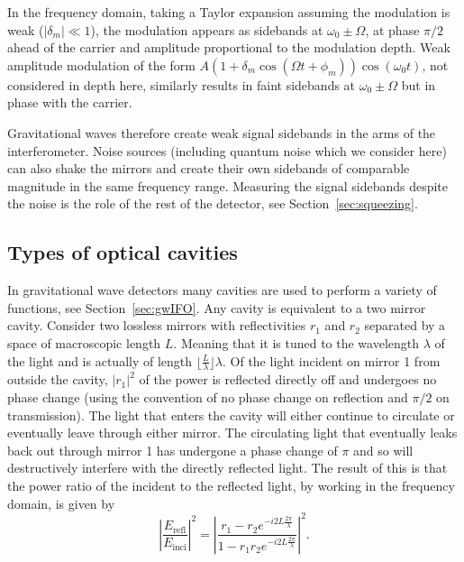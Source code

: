\documentclass[aps,pra,superscriptaddress,reprint,nofootinbib]{revtex4-1}
\newcommand{\abs}[1]{\left\lvert #1 \right\rvert}
\begin{document}
In the frequency domain, taking a Taylor expansion assuming the modulation is weak ($\abs{\delta_m} \ll 1$), the modulation appears as sidebands at $\omega_0 \pm \Omega$, at phase $\pi/2$ ahead of the carrier and amplitude proportional to the modulation depth.
Weak amplitude modulation of the form $A (1 + \delta_m \cos(\Omega t + \phi_m)) \cos(\omega_0 t)$, not considered in depth here, similarly results in faint sidebands at $\omega_0 \pm \Omega$ but in phase with the carrier.


Gravitational waves therefore create weak signal sidebands in the arms of the interferometer. Noise sources (including quantum noise which we consider here) can also shake the mirrors and create their own sidebands of comparable magnitude in the same frequency range. Measuring the signal sidebands despite the noise is the role of the rest of the detector, see Section~\ref{sec:squeezing}.


\subsection{Types of optical cavities}

In gravitational wave detectors many cavities are used to perform a variety of functions, see Section~\ref{sec:gwIFO}. Any cavity is equivalent to a two mirror cavity. Consider two lossless mirrors with reflectivities $r_1$ and $r_2$ separated by a space of macroscopic length $L$. Meaning that it is tuned to the wavelength $\lambda$ of the light and is actually of length $\lfloor \frac{L}{\lambda} \rfloor \lambda$. Of the light incident on mirror 1 from outside the cavity, $\abs{r_1}^2$ of the power is reflected directly off and undergoes no phase change (using the convention of no phase change on reflection and $\pi/2$ on transmission). The light that enters the cavity will either continue to circulate or eventually leave through either mirror. The circulating light that eventually leaks back out through mirror 1 has undergone a phase change of $\pi$ and so will destructively interfere with the directly reflected light. The result of this is that the power ratio of the incident to the reflected light, by working in the frequency domain, is given by~\cite{Danilishin_2012}
$$\abs{\frac{E_{\mathrm{refl}}}{E_{\mathrm{inci}}}}^2 = \abs{\frac{r_1 - r_2 e^{-i 2 L \frac{2\pi}{\lambda}}}{1- r_1 r_2 e^{-i 2 L \frac{2\pi}{\lambda}}}}^2.$$ 
\end{document}
